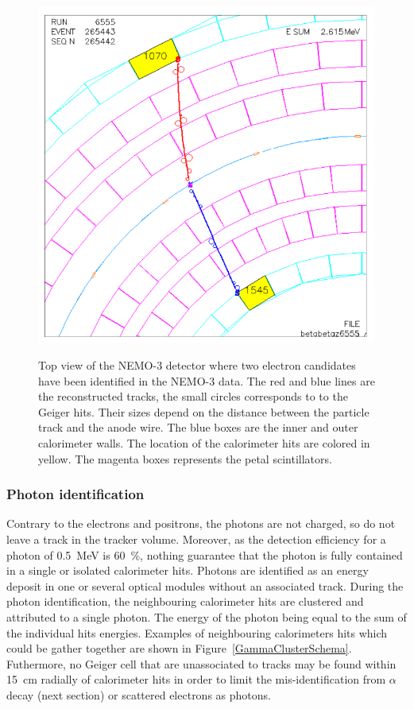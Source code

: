 \documentclass[main.tex]{subfiles}
\begin{document}
\begin{figure}[h!]
\centering
\includegraphics[scale=0.35]{pictures/Chap6/betabetaEvent.png}
\label{DoubleBetaEventDisplay}
\caption{Top view of the NEMO-3 detector where two electron candidates have been identified in the NEMO-3 data. The red and blue lines are the reconstructed tracks, the small circles corresponds to to the Geiger hits. Their sizes depend on the distance between the particle track and the anode wire. The blue boxes are the inner and outer calorimeter walls. The location of the calorimeter hits are colored in yellow. The magenta boxes represents the petal scintillators.}
\end{figure}

\FloatBarrier

\subsubsection{Photon identification}


\NI Contrary to the electrons and positrons, the photons are not charged, so do not leave a track in the tracker volume. Moreover, as the detection efficiency for a photon of 0.5~MeV is 60~\%, nothing guarantee that the photon is fully contained in a single or isolated calorimeter hits. Photons are identified as an energy deposit in one or several optical modules without an associated track. During the photon identification, the neighbouring calorimeter hits are clustered and attributed to a single photon. The energy of the photon being equal to the sum of the individual hits energies. Examples of neighbouring calorimeters hits which could be gather together are shown in Figure~\ref{GammaClusterSchema}. Futhermore, no Geiger cell that are unassociated to tracks may be found within 15~cm radially of calorimeter hits in order to limit the mis-identification from $\alpha$ decay (next section) or scattered electrons as photons.
\end{document}
